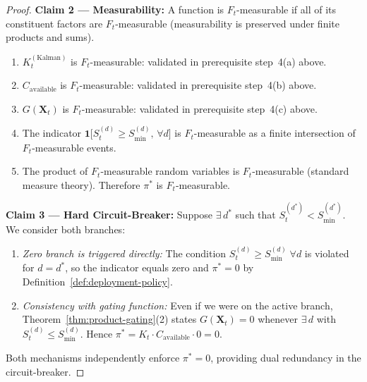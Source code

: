 \documentclass[12pt,openany]{book}
\newcommand{\calF}{\mathcal{F}}
\numberwithin{equation}{chapter}
\theoremstyle{plain}
\theoremstyle{definition}
\theoremstyle{remark}
\def\mathcal#1{#1}%
\begin{document}
\begin{proof}
\medskip
\noindent\textbf{Claim 2 --- Measurability:}
A function is $\calF_t$-measurable if all of its constituent
factors are $\calF_t$-measurable (measurability is preserved
under finite products and sums).

\begin{enumerate}
  \item[(2a)] $K_t^{(\mathrm{Kalman})}$ is $\calF_t$-measurable:
        validated in prerequisite step~4(a) above.
  \item[(2b)] $C_{\mathrm{available}}$ is $\calF_t$-measurable:
        validated in prerequisite step~4(b) above.
  \item[(2c)] $G(\mathbf{X}_t)$ is $\calF_t$-measurable:
        validated in prerequisite step~4(c) above.
  \item[(2d)] The indicator
        $\mathbf{1}\bigl[
          \mathcal{S}_t^{(d)} \geq \mathcal{S}_{\min}^{(d)},\,
          \forall d
        \bigr]$
        is $\calF_t$-measurable as a finite intersection of
        $\calF_t$-measurable events.
  \item[(2e)] The product of $\calF_t$-measurable random
        variables is $\calF_t$-measurable (standard measure
        theory).  Therefore $\pi^*$ is $\calF_t$-measurable.
\end{enumerate}

\medskip
\noindent\textbf{Claim 3 --- Hard Circuit-Breaker:}
Suppose $\exists\, d^*$ such that
$\mathcal{S}_t^{(d^*)} < \mathcal{S}_{\min}^{(d^*)}$.
We consider both branches:

\begin{enumerate}
  \item[(3a)] \emph{Zero branch is triggered directly:}
        The condition
        $\mathcal{S}_t^{(d)} \geq \mathcal{S}_{\min}^{(d)}\;
        \forall d$
        is violated for $d = d^*$, so the indicator equals
        zero and $\pi^* = 0$ by Definition~\ref{def:deployment-policy}.

  \item[(3b)] \emph{Consistency with gating function:}
        Even if we were on the active branch,
        Theorem~\ref{thm:product-gating}(2) states
        $G(\mathbf{X}_t) = 0$ whenever
        $\exists\, d$ with
        $\mathcal{S}_t^{(d)} \leq \mathcal{S}_{\min}^{(d)}$.
        Hence $\pi^* = K_t \cdot C_{\mathrm{available}} \cdot 0 = 0$.
\end{enumerate}

Both mechanisms independently enforce $\pi^* = 0$,
providing dual redundancy in the circuit-breaker.


\end{proof}
\end{document}
